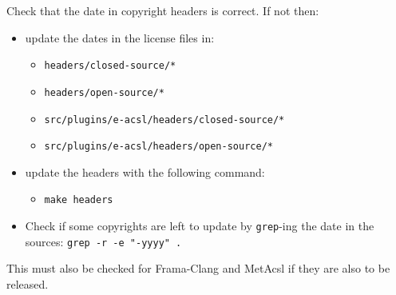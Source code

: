 Check that the date in copyright headers is correct. If not then:
\begin{itemize}
  \item update the dates in the license files in:
  \begin{itemize}
    \item \texttt{headers/closed-source/*}
    \item \texttt{headers/open-source/*}
    \item \texttt{src/plugins/e-acsl/headers/closed-source/*}
    \item \texttt{src/plugins/e-acsl/headers/open-source/*}
  \end{itemize}
  \item update the headers with the following command:
  \begin{itemize}
    \item \texttt{make headers}
  \end{itemize}
  \item Check if some copyrights are left to update by \texttt{grep}-ing the date in the sources: \texttt{grep -r -e "-yyyy" .}
\end{itemize}

This must also be checked for Frama-Clang and MetAcsl if they are also to be
released.

